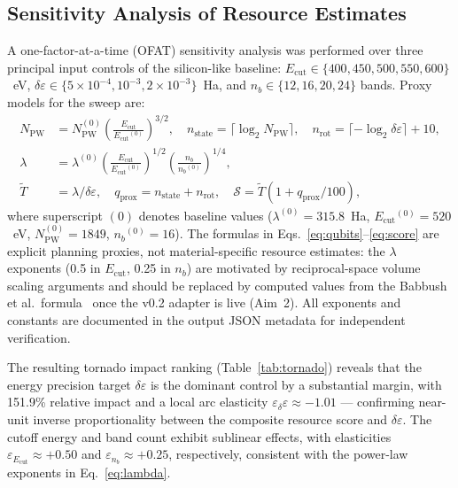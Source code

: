 \documentclass[11pt]{article}
\newcommand{\de}{\delta\varepsilon}
\newcommand{\Ecut}{E_{\mathrm{cut}}{}}
\newcommand{\nb}{{n_b}}
\newcommand{\NPW}{N_{\mathrm{PW}}}
\newcommand{\tgate}{\widetilde{T}}
\newcommand{\qprox}{q_{\mathrm{prox}}}
\newcommand{\score}{\mathcal{S}}
\begin{document}
\subsection{Sensitivity Analysis of Resource Estimates}

A one-factor-at-a-time (OFAT) sensitivity analysis was performed over
three principal input controls of the silicon-like baseline:
$\Ecut \in \{400, 450, 500, 550, 600\}$~eV,
$\de \in \{5 \times 10^{-4}, 10^{-3}, 2 \times 10^{-3}\}$~Ha, and
$\nb \in \{12, 16, 20, 24\}$ bands.
Proxy models for the sweep are:
\begin{align}
  \NPW &= \NPW^{(0)}
         \!\left(\frac{\Ecut}{\Ecut^{(0)}}\right)^{\!3/2}, \quad
  n_{\mathrm{state}} = \lceil\log_2 \NPW\rceil, \quad
  n_{\mathrm{rot}} = \lceil{-\log_2 \de}\rceil + 10,
  \label{eq:qubits}\\
  \lambda &= \lambda^{(0)}
             \!\left(\frac{\Ecut}{\Ecut^{(0)}}\right)^{\!1/2}
             \!\left(\frac{\nb}{\nb^{(0)}}\right)^{\!1/4},
  \label{eq:lambda}\\
  \tgate &= \lambda / \de, \quad
  \qprox = n_{\mathrm{state}} + n_{\mathrm{rot}}, \quad
  \score = \tgate \!\left(1 + \qprox/100\right),
  \label{eq:score}
\end{align}
where superscript $(0)$ denotes baseline values
($\lambda^{(0)} = 315.8$~Ha, $\Ecut^{(0)} = 520$~eV,
$\NPW^{(0)} = 1849$, $\nb^{(0)} = 16$).
The formulas in Eqs.~\eqref{eq:qubits}--\eqref{eq:score} are explicit
planning proxies, not material-specific resource estimates: the $\lambda$
exponents (0.5 in $\Ecut$, 0.25 in $\nb$) are motivated by reciprocal-space
volume scaling arguments and should be replaced by computed values from the
Babbush et al.\ formula~\cite{Babbush2019} once the v0.2 adapter is live
(Aim~2). All exponents and constants are documented in the
output JSON metadata for independent verification.

The resulting tornado impact ranking (Table~\ref{tab:tornado}) reveals
that the energy precision target $\de$ is the dominant control by a
substantial margin, with 151.9\% relative impact and a local arc
elasticity $\varepsilon_\de \approx -1.01$ --- confirming near-unit
inverse proportionality between the composite resource score and $\de$.
The cutoff energy and band count exhibit sublinear effects, with
elasticities $\varepsilon_{E_{\mathrm{cut}}} \approx +0.50$ and
$\varepsilon_\nb \approx +0.25$, respectively, consistent with the
power-law exponents in Eq.~\eqref{eq:lambda}.
\end{document}
